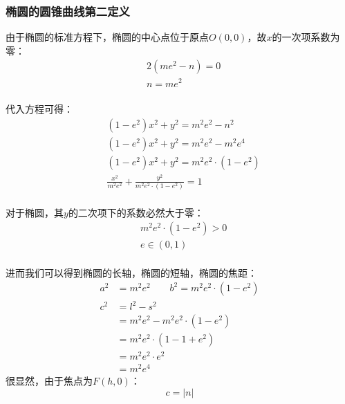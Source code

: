 \documentclass[UTF8]{ctexart}
\begin{document}
\newpage

\subsubsection{椭圆的圆锥曲线第二定义}
    \setcounter{equation}{0}
    由于椭圆的标准方程下，椭圆的中心点位于原点$O(0,0)$，故$x$的一次项系数为零：\vspace{5pt}
    \begin{align}
        &2\left(me^2-n\right)=0\\[3mm]
        &n=me^2
    \end{align}\\
    代入方程可得：
    \begin{align}
        &\left(1-e^2\right)x^2+y^2=m^2e^2-n^2\\[3mm]
        &\left(1-e^2\right)x^2+y^2=m^2e^2-m^2e^4\\[3mm]
        &\left(1-e^2\right)x^2+y^2=m^2e^2\cdot\left(1-e^2\right)\\[3mm]
        &\frac{x^2}{m^2e^2}+\frac{y^2}{m^2e^2\cdot\left(1-e^2\right)}=1
    \end{align}\\[1mm]
    对于椭圆，其$y$的二次项下的系数必然大于零：\vspace{5pt}
    \begin{align}
        &m^2e^2\cdot\left(1-e^2\right)>0\\[3mm]
        &e\in(0,1)
    \end{align}\\
    进而我们可以得到椭圆的长轴，椭圆的短轴，椭圆的焦距：\vspace{5pt}
    \begin{align}
        a^2&=m^2e^2\qquad b^2=m^2e^2\cdot\left(1-e^2\right)\\[4mm]
        c^2&=l^2-s^2\\[3mm]
        &=m^2e^2-m^2e^2\cdot\left(1-e^2\right)\\[3mm]
        &=m^2e^2\cdot\left(1-1+e^2\right)\\[3mm]
        &=m^2e^2\cdot e^2\\[3mm]
        &=m^2e^4
    \end{align}
    很显然，由于焦点为$F(h,0)$：
    \begin{equation}
        c=|n|
    \end{equation}

\newpage
\end{document}
